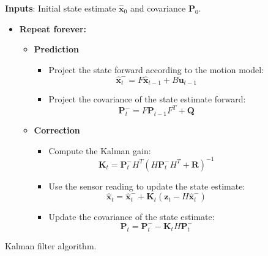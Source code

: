 \begin{figure}
  \begin{framed}
    \textbf{Inputs}: Initial state estimate $\hat{\mathbf{x}}_0$ and covariance  $\mathbf{P}_0$.
    \vspace{1em}
    \begin{itemize}
      \item \textbf{Repeat forever:}
\begin{itemize} 
\item \textbf{Prediction}
  \begin{itemize}
    \item Project the state forward according to the motion model:
      \begin{equation}
        \label{eq:kal_update_x}
    \hat{\mathbf{x}}^-_t = F \hat{\mathbf{x}}_{t-1} + B \mathbf{u}_{t-1}
  \end{equation}
  \item Project the covariance of the state estimate forward: 
  \begin{equation}
        \label{eq:kal_update_P}
    \mathbf{P}^-_t = F \mathbf{P}_{t-1}F^T + \mathbf{Q}
  \end{equation}
  \end{itemize}
  
\item \textbf{Correction}
  \begin{itemize}
  \item Compute the Kalman gain:
    \begin{equation}
      \label{eq:kal_correct_K}
      \mathbf{K}_t = \mathbf{P}^-_t H^T(H \mathbf{P}^-_t H^T +  \mathbf{R})^{-1}
    \end{equation}
  \item Use the sensor reading to update the state estimate:
    \begin{equation}
      \label{eq:kal_correct_x}
      \hat{\mathbf{x}}_t =\hat{\mathbf{x}}^-_t + \mathbf{K}_t (\mathbf{z}_t - H \hat{\mathbf{x}}^-_t)
    \end{equation}
  \item Update the covariance of the state estimate:
    \begin{equation}
      \label{eq:kal_correct_P}
    \mathbf{P}_t =  \mathbf{P}^-_t - \mathbf{K}_t H\mathbf{P}^-_t\end{equation}
  \end{itemize}
\end{itemize}
\end{itemize}
\end{framed}

\caption{Kalman filter algorithm.}
  \label{fig:kalman_algorithm}
\end{figure}


